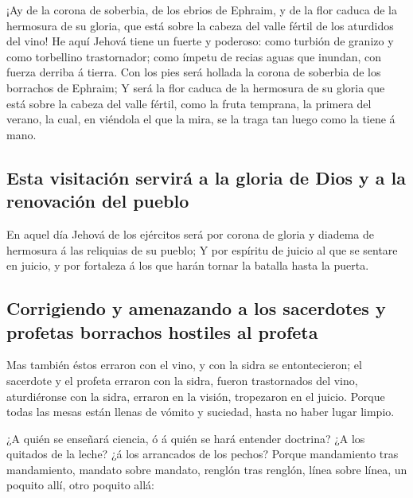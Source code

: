  ¡Ay de la corona de soberbia, de los ebrios de Ephraim, y
de la flor caduca de la hermosura de su gloria, que está sobre la cabeza
del valle fértil de los aturdidos del vino!  He aquí Jehová
tiene un fuerte y poderoso: como turbión de granizo y como torbellino
trastornador; como ímpetu de recias aguas que inundan, con fuerza
derriba á tierra.  Con los pies será hollada la corona de
soberbia de los borrachos de Ephraim;  Y será la flor caduca
de la hermosura de su gloria que está sobre la cabeza del valle fértil,
como la fruta temprana, la primera del verano, la cual, en viéndola el
que la mira, se la traga tan luego como la tiene á mano.

\hypertarget{esta-visitaciuxf3n-serviruxe1-a-la-gloria-de-dios-y-a-la-renovaciuxf3n-del-pueblo}{%
\subsection{Esta visitación servirá a la gloria de Dios y a la
renovación del
pueblo}\label{esta-visitaciuxf3n-serviruxe1-a-la-gloria-de-dios-y-a-la-renovaciuxf3n-del-pueblo}}

 En aquel día Jehová de los ejércitos será por corona de
gloria y diadema de hermosura á las reliquias de su pueblo; 
Y por espíritu de juicio al que se sentare en juicio, y por fortaleza á
los que harán tornar la batalla hasta la puerta.

\hypertarget{corrigiendo-y-amenazando-a-los-sacerdotes-y-profetas-borrachos-hostiles-al-profeta}{%
\subsection{Corrigiendo y amenazando a los sacerdotes y profetas
borrachos hostiles al
profeta}\label{corrigiendo-y-amenazando-a-los-sacerdotes-y-profetas-borrachos-hostiles-al-profeta}}

 Mas también éstos erraron con el vino, y con la sidra se
entontecieron; el sacerdote y el profeta erraron con la sidra, fueron
trastornados del vino, aturdiéronse con la sidra, erraron en la visión,
tropezaron en el juicio.  Porque todas las mesas están
llenas de vómito y suciedad, hasta no haber lugar limpio.

 ¿A quién se enseñará ciencia, ó á quién se hará entender
doctrina? ¿A los quitados de la leche? ¿á los arrancados de los pechos?
 Porque mandamiento tras mandamiento, mandato sobre
mandato, renglón tras renglón, línea sobre línea, un poquito allí, otro
poquito allá:

